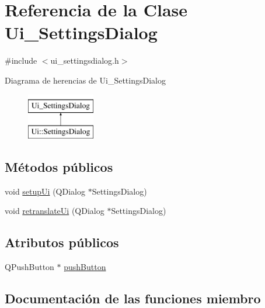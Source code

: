 \hypertarget{class_ui___settings_dialog}{}\section{Referencia de la Clase Ui\+\_\+\+Settings\+Dialog}
\label{class_ui___settings_dialog}


{\ttfamily \#include $<$ui\+\_\+settingsdialog.\+h$>$}

Diagrama de herencias de Ui\+\_\+\+Settings\+Dialog\begin{figure}[H]
\begin{center}
\leavevmode
\includegraphics[height=2.000000cm]{class_ui___settings_dialog}
\end{center}
\end{figure}
\subsection*{Métodos públicos}
\begin{DoxyCompactItemize}
\item 
void \hyperlink{class_ui___settings_dialog_a4666ab89748eeb11cdb95d857bd02c6e}{setup\+Ui} (Q\+Dialog $\ast$Settings\+Dialog)
\item 
void \hyperlink{class_ui___settings_dialog_a7a0adf32eef516ceffcc0633a90c3b34}{retranslate\+Ui} (Q\+Dialog $\ast$Settings\+Dialog)
\end{DoxyCompactItemize}
\subsection*{Atributos públicos}
\begin{DoxyCompactItemize}
\item 
Q\+Push\+Button $\ast$ \hyperlink{class_ui___settings_dialog_a8ab206d31af69502c419725b55addf97}{push\+Button}
\end{DoxyCompactItemize}


\subsection{Documentación de las funciones miembro}

